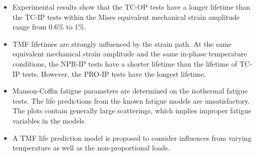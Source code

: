\documentclass[preprint,5p,twocolumn,11pt,sort&compress]{elsarticle}
\begin{document}
\begin{itemize}
\item Experimental results show that the TC-OP tests have a longer lifetime than the TC-IP tests within the Mises equivalent mechanical strain amplitude range from 0.6\% to 1\%.

\item TMF lifetimes are strongly influenced by the strain path. At the same equivalent mechanical strain amplitude and the same in-phase temperature conditions, the NPR-IP tests have a shorter lifetime than the lifetime of TC-IP tests. However, the PRO-IP tests have the longest lifetime.

\item Manson-Coffin fatigue parameters are determined on the isothermal fatigue tests. The life predictions from the known fatigue models are unsatisfactory. The plots contain generally large scatterings, which implies improper fatigue variables in the models.

\item A TMF life prediction model is proposed to consider influences from varying temperature as well as the non-proportional loads.
\end{itemize}



\end{document}
